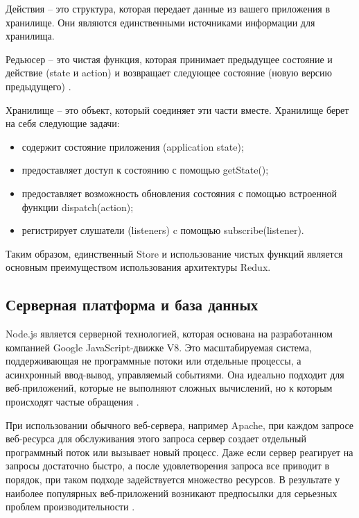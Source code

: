 Действия -- это структура, которая передает данные из вашего приложения в хранилище. Они являются единственными источниками информации для хранилища.

Редьюсер -- это чистая функция, которая принимает предыдущее состояние и действие (state и action) и возвращает следующее состояние (новую версию предыдущего) \cite{redux_framework}.

Хранилище -- это объект, который соединяет эти части вместе. Хранилище берет на себя следующие задачи:
\begin{itemize}
  \item содержит состояние приложения (application state);
  \item предоставляет доступ к состоянию с помощью getState();
  \item предоставляет возможность обновления состояния с помощью встроенной функции dispatch(action);
  \item регистрирует слушатели (listeners) c помощью subscribe(listener).
\end{itemize}

Таким образом, единственный Store и использование чистых функций является основным преимуществом использования архитектуры Redux.


\subsection{Серверная платформа и база данных}
\label{sub:domain:mdl_principle}
Node.js является серверной технологией, которая основана на разработанном компанией Google JavaScript-движке V8. Это масштабируемая система, поддерживающая не программные потоки или отдельные процессы, а асинхронный ввод-вывод, управляемый событиями. Она идеально подходит для веб-приложений, которые не выполняют сложных вычислений, но к которым происходят частые обращения \cite{node_js}.

При использовании обычного веб-сервера, например Apache, при каждом запросе веб-ресурса для обслуживания этого запроса сервер создает отдельный программный поток или вызывает новый процесс. Даже если сервер реагирует на запросы достаточно быстро, а после удовлетворения запроса все приводит в порядок, при таком подходе задействуется множество ресурсов. В результате у наиболее популярных веб-приложений возникают предпосылки для серьезных проблем производительности \cite{apache}.

